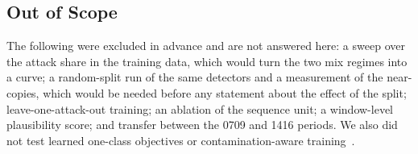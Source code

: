 \subsection{Out of Scope}\label{sec:scope}

The following were excluded in advance and are not answered here: a sweep over the attack share in the training
data, which would turn the two mix regimes into a curve; a random-split run of the same detectors and a
measurement of the near-copies, which would be needed before any statement about the effect of the split;
leave-one-attack-out training; an ablation of the sequence unit; a window-level plausibility score; and transfer
between the 0709 and 1416 periods. We also did not test learned one-class objectives or contamination-aware
training~\cite{ruff2018deep,ruff2020deep,qiu2022latent}.
